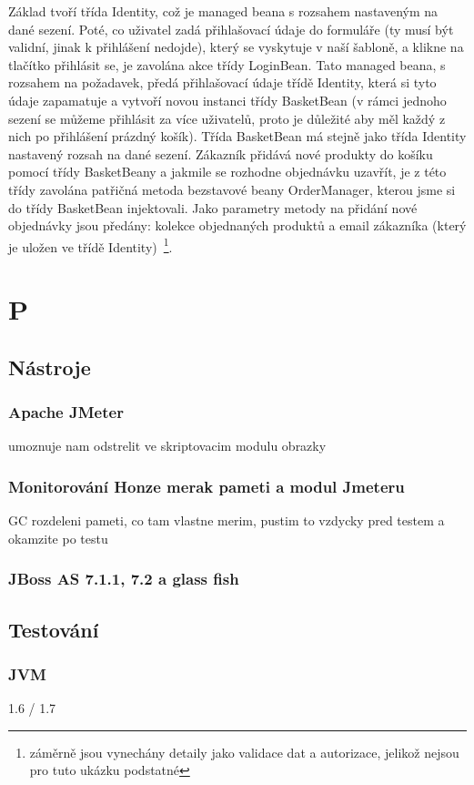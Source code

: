 \documentclass[122pt,oneside]{fithesis}
\begin{document}
Základ tvoří třída Identity, což je managed beana s rozsahem nastaveným na dané sezení. Poté, co uživatel zadá přihlašovací údaje do formuláře (ty musí být validní, jinak k přihlášení nedojde), který se vyskytuje v naší šabloně, a klikne na tlačítko přihlásit se, je zavolána akce třídy LoginBean. Tato managed beana, s rozsahem na požadavek, předá přihlašovací údaje třídě Identity, která si tyto údaje zapamatuje a vytvoří novou instanci třídy BasketBean (v rámci jednoho sezení se můžeme přihlásit za více uživatelů, proto je důležité aby měl každý z nich po přihlášení prázdný košík). Třída BasketBean má stejně jako třída Identity nastavený rozsah na dané sezení. Zákazník přidává nové produkty do košíku pomocí třídy BasketBeany a jakmile se rozhodne objednávku uzavřít, je z této třídy zavolána patřičná metoda bezstavové beany OrderManager, kterou jsme si do třídy BasketBean injektovali. Jako parametry metody na přidání nové objednávky jsou předány: kolekce objednaných produktů a email zákazníka (který je uložen ve třídě Identity)~\footnote{záměrně jsou vynechány detaily jako validace dat a autorizace, jelikož nejsou pro tuto ukázku podstatné}.

\chapter{P}
\section{Nástroje}
\subsection{Apache JMeter}
umoznuje nam odstrelit ve skriptovacim modulu obrazky
\subsection{Monitorování Honze merak pameti a modul Jmeteru}
GC rozdeleni pameti, co tam vlastne merim, pustim to vzdycky pred testem a okamzite po testu
\subsection{JBoss AS 7.1.1, 7.2 a glass fish}

\section{Testování}

\subsection{JVM}
1.6 / 1.7
\end{document}

